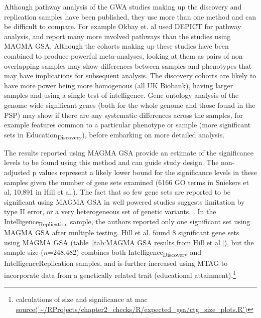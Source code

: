 Although pathway analysis of the GWA studies making up the discovery and replication samples have been published\cite{sniekers2017genome}\cite{okbay2016genome}\cite{hill2019combined}, they use more than one method and can be difficult to compare. For example Okbay et. al\cite{okbay2016genome} used DEPICT for pathway analysis\cite{pers2015biological}, and report many more involved pathways than the studies using MAGMA GSA\cite{sniekers2017genome}\cite{hill2019combined}. Although the cohorts making up these studies have been combined to produce powerful meta-analyses, looking at them as pairs of non overlapping samples may show differences between samples and phenotypes that may have implications for subsequent analysis. The discovery cohorts are likely to have more power being more homogenous (all UK Biobank), having larger samples and using a single test of intelligence. Gene ontology analysis of the genome wide significant genes (both for the whole genome and those found in the PSP) may show if there are any systematic differences across the samples, for example features common to a particular phenotype or sample (more significant sets in Education\textsubscript{Discovery}), before embarking on more detailed analysis.

The results reported using MAGMA GSA  provide an estimate of the significance levels to be found using this method and can guide study design\cite{sniekers2017genome}\cite{hill2019combined}. The non-adjusted p values represent a likely lower bound for the significance levels in these samples given the number of gene sets examined (6166 GO terms in Sniekers et al\cite{sniekers2017genome}, 10,891 in Hill et al.\cite{hill2019combined}). The fact that so few gene sets are reported to be significant using MAGMA GSA in well powered studies suggests limitation by type II error, or a very heterogeneous set of genetic variants. \cite{sniekers2017genome}\cite{hill2019combined}. In the Intelligence\textsubscript{Replication} sample, the authors reported only one significant set using MAGMA GSA after multiple testing\cite{sniekers2017genome}. Hill et al. found 8 significant gene sets using MAGMA GSA (table~\ref{tab:MAGMA GSA results from Hill et al.}), but the sample size ($n$=248,482)  combines both Intelligence\textsubscript{Discovery} and Intelligence{Replication} samples, and is further increased using MTAG to incorporate data from a genetically related trait (educational attainment)\cite{hill2019combined}\cite{turley2018multi}.\footnote{calculations of size and significance at mac \url{ source('~/RProjects/chapter2_checks/R/expected_gsa/ctg_size_plots.R')}}

